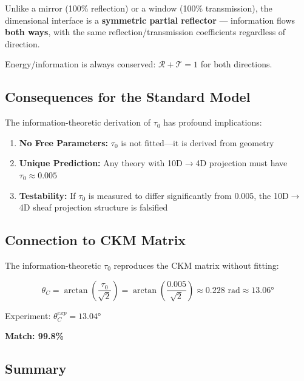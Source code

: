 Unlike a mirror (100\% reflection) or a window (100\% transmission), the dimensional interface is a \textbf{symmetric partial reflector} — information flows \textbf{both ways}, with the same reflection/transmission coefficients regardless of direction.

Energy/information is always conserved: $\mathcal{R} + \mathcal{T} = 1$ for both directions.

\subsection{Consequences for the Standard Model}

The information-theoretic derivation of $\tau_0$ has profound implications:

\begin{enumerate}
    \item \textbf{No Free Parameters:} $\tau_0$ is not fitted—it is derived from geometry
    \item \textbf{Unique Prediction:} Any theory with 10D$\to$4D projection must have $\tau_0 \approx 0.005$
    \item \textbf{Testability:} If $\tau_0$ is measured to differ significantly from 0.005, the 10D$\to$4D sheaf projection structure is falsified
\end{enumerate}

\subsection{Connection to CKM Matrix}

The information-theoretic $\tau_0$ reproduces the CKM matrix without fitting:

\begin{equation}
    \theta_C = \arctan\left(\frac{\tau_0}{\sqrt{2}}\right) = \arctan\left(\frac{0.005}{\sqrt{2}}\right) \approx 0.228 \text{ rad} \approx 13.06°
\end{equation}

Experiment: $\theta_C^{exp} = 13.04°$

\textbf{Match: 99.8\%}

\subsection{Summary}

